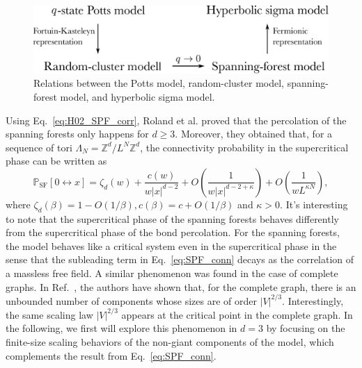 \begin{figure}[b]
	\centering
	\vspace{5ex}%
	\includegraphics[width=0.8\columnwidth]{figures/diagram/relation.pdf}
	\caption{Relations between the Potts model, random-cluster model, spanning-forest model, and hyperbolic sigma model.}
	\label{fig:model_relation}
	\vspace{3ex}%
\end{figure}

Using Eq.~\eqref{eq:H02_SPF_corr}, Roland et al. proved that the percolation of the spanning forests only happens for $d\geq 3$.
Moreover, they obtained that, for a sequence of tori $\Lambda_N = \mathbb{Z}^d/L^N\mathbb{Z}^d$, the connectivity probability
in the supercritical phase can be written as
\begin{equation}\label{eq:SPF_conn}
	\mathbb{P}_{\text{SF}}[0\leftrightarrow x] = \zeta_{d}(w)+\frac{c(w)}{w|x|^{d-2}}+O\left(\frac{1}{w|x|^{d-2+\kappa}}\right)+O\left(\frac{1}{w L^{\kappa N}}\right),
\end{equation}
where $\zeta_{d}(\beta)=1-O(1 / \beta), c(\beta)=c+O(1 / \beta)$ and $\kappa > 0$. It's interesting to note that the supercritical
phase of the spanning forests behaves differently from the supercritical phase of the bond percolation. For the spanning forests,
the model behaves like a critical system even in the supercritical phase in the sense that the subleading term in Eq.~\eqref{eq:SPF_conn}
decays as the correlation of a massless free field. A similar phenomenon was found in the case of complete graphs. 
In Ref.~, the authors have shown that, for the complete graph, there is an unbounded number of components whose sizes are of order $|V|^{2/3}$.
Interestingly, the same scaling law $|V|^{2/3}$ appears at the critical point in the complete graph. In the following, 
we first will explore this phenomenon in $d=3$ by focusing on the finite-size scaling behaviors of the non-giant components of the model, which
complements the result from Eq.~\eqref{eq:SPF_conn}.
